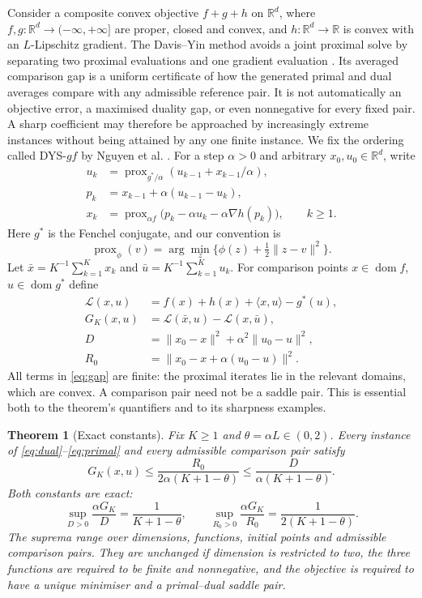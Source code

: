 \documentclass[11pt,a4paper]{article}
\newtheorem{theorem}{Theorem}
\theoremstyle{remark}\newtheorem{remark}[theorem]{Remark}
\DeclareMathOperator{\prox}{prox}
\DeclareMathOperator{\dom}{dom}
\newcommand{\R}{\mathbb R}
\newcommand{\ip}[2]{\langle #1,#2\rangle}
\newcommand{\norm}[1]{\lVert #1\rVert}
\begin{document}
Consider a composite convex objective $f+g+h$ on $\R^d$, where $f,g:\R^d\to(-\infty,+\infty]$ are proper, closed and convex, and $h:\R^d\to\R$ is convex with an $L$-Lipschitz gradient. The Davis--Yin method avoids a joint proximal solve by separating two proximal evaluations and one gradient evaluation \cite{davis2017}. Its averaged comparison gap is a uniform certificate of how the generated primal and dual averages compare with any admissible reference pair. It is not automatically an objective error, a maximised duality gap, or even nonnegative for every fixed pair. A sharp coefficient may therefore be approached by increasingly extreme instances without being attained by any one finite instance. We fix the ordering called DYS-$gf$ by Nguyen et al. \cite{nguyen2025}. For a step $\alpha>0$ and arbitrary $x_0,u_0\in\R^d$, write
\begin{align}
u_k&=\prox_{g^*/\alpha}(u_{k-1}+x_{k-1}/\alpha),\label{eq:dual}\\
p_k&=x_{k-1}+\alpha(u_{k-1}-u_k),\label{eq:p}\\
x_k&=\prox_{\alpha f}\bigl(p_k-\alpha u_k-\alpha\nabla h(p_k)\bigr),\qquad k\ge1.\label{eq:primal}
\end{align}
Here $g^*$ is the Fenchel conjugate, and our convention is
\[
\prox_\phi(v)=\arg\min_z\{\phi(z)+\tfrac12\norm{z-v}^2\}.
\]
Let $\bar x=K^{-1}\sum_{k=1}^Kx_k$ and $\bar u=K^{-1}\sum_{k=1}^Ku_k$. For comparison points $x\in\dom f$, $u\in\dom g^*$ define
\begin{align}
\mathcal L(x,u)&=f(x)+h(x)+\ip{x}{u}-g^*(u),\nonumber\\
G_K(x,u)&=\mathcal L(\bar x,u)-\mathcal L(x,\bar u),\label{eq:gap}\\
D&=\norm{x_0-x}^2+\alpha^2\norm{u_0-u}^2,\nonumber\\
R_0&=\norm{x_0-x+\alpha(u_0-u)}^2.\label{eq:metrics}
\end{align}
All terms in \eqref{eq:gap} are finite: the proximal iterates lie in the relevant domains, which are convex. A comparison pair need not be a saddle pair. This is essential both to the theorem's quantifiers and to its sharpness examples.

\begin{theorem}[Exact constants]\label{thm:main}
Fix $K\ge1$ and $\theta=\alpha L\in(0,2)$. Every instance of \eqref{eq:dual}--\eqref{eq:primal} and every admissible comparison pair satisfy
\begin{equation}\label{eq:bound}
G_K(x,u)\le \frac{R_0}{2\alpha(K+1-\theta)}
\le \frac{D}{\alpha(K+1-\theta)}.
\end{equation}
Both constants are exact:
\begin{equation}\label{eq:suprema}
\sup_{D>0}\frac{\alpha G_K}{D}=\frac1{K+1-\theta},
\qquad
\sup_{R_0>0}\frac{\alpha G_K}{R_0}=\frac1{2(K+1-\theta)}.
\end{equation}
The suprema range over dimensions, functions, initial points and admissible comparison pairs. They are unchanged if dimension is restricted to two, the three functions are required to be finite and nonnegative, and the objective is required to have a unique minimiser and a primal--dual saddle pair.
\end{theorem}
\end{document}
